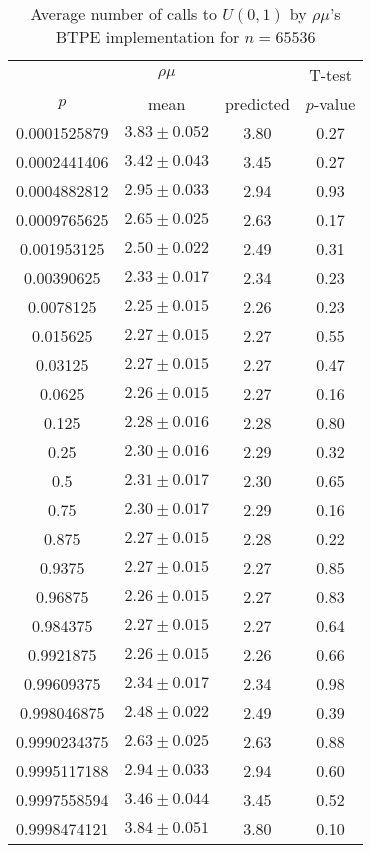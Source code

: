 \begin{table}[t]
\caption{Average number of calls to $U(0,1)$ by $\rho\mu$'s BTPE implementation for $n=65536$}
\label{tab:calls65536}
\begin{tabular}{cccc} \hline
    & $\rho\mu$ & & T-test \\
$p$ & mean & predicted & $p$-value \\ \hline
0.0001525879 & $3.83 \pm 0.052$ & 3.80 & 0.27 \\
0.0002441406 & $3.42 \pm 0.043$ & 3.45 & 0.27 \\
0.0004882812 & $2.95 \pm 0.033$ & 2.94 & 0.93 \\
0.0009765625 & $2.65 \pm 0.025$ & 2.63 & 0.17 \\
0.001953125  & $2.50 \pm 0.022$ & 2.49 & 0.31 \\
0.00390625   & $2.33 \pm 0.017$ & 2.34 & 0.23 \\
0.0078125    & $2.25 \pm 0.015$ & 2.26 & 0.23 \\
0.015625     & $2.27 \pm 0.015$ & 2.27 & 0.55 \\
0.03125      & $2.27 \pm 0.015$ & 2.27 & 0.47 \\
0.0625       & $2.26 \pm 0.015$ & 2.27 & 0.16 \\
0.125        & $2.28 \pm 0.016$ & 2.28 & 0.80 \\
0.25         & $2.30 \pm 0.016$ & 2.29 & 0.32 \\
0.5          & $2.31 \pm 0.017$ & 2.30 & 0.65 \\
0.75         & $2.30 \pm 0.017$ & 2.29 & 0.16 \\
0.875        & $2.27 \pm 0.015$ & 2.28 & 0.22 \\
0.9375       & $2.27 \pm 0.015$ & 2.27 & 0.85 \\
0.96875      & $2.26 \pm 0.015$ & 2.27 & 0.83 \\
0.984375     & $2.27 \pm 0.015$ & 2.27 & 0.64 \\
0.9921875    & $2.26 \pm 0.015$ & 2.26 & 0.66 \\
0.99609375   & $2.34 \pm 0.017$ & 2.34 & 0.98 \\
0.998046875  & $2.48 \pm 0.022$ & 2.49 & 0.39 \\
0.9990234375 & $2.63 \pm 0.025$ & 2.63 & 0.88 \\
0.9995117188 & $2.94 \pm 0.033$ & 2.94 & 0.60 \\
0.9997558594 & $3.46 \pm 0.044$ & 3.45 & 0.52 \\
0.9998474121 & $3.84 \pm 0.051$ & 3.80 & 0.10 \\
\hline
\end{tabular}
\end{table}

